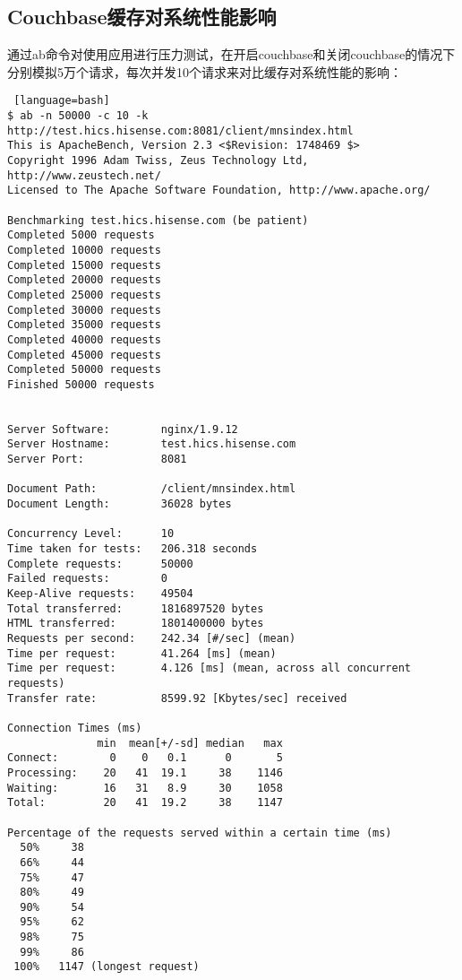 \subsection{Couchbase缓存对系统性能影响}
通过ab命令对使用应用进行压力测试，在开启couchbase和关闭couchbase的情况下分别模拟5万个请求，每次并发10个请求来对比缓存对系统性能的影响：
\begin{lstlisting} [language=bash]
$ ab -n 50000 -c 10 -k http://test.hics.hisense.com:8081/client/mnsindex.html
This is ApacheBench, Version 2.3 <$Revision: 1748469 $>
Copyright 1996 Adam Twiss, Zeus Technology Ltd, http://www.zeustech.net/
Licensed to The Apache Software Foundation, http://www.apache.org/

Benchmarking test.hics.hisense.com (be patient)
Completed 5000 requests
Completed 10000 requests
Completed 15000 requests
Completed 20000 requests
Completed 25000 requests
Completed 30000 requests
Completed 35000 requests
Completed 40000 requests
Completed 45000 requests
Completed 50000 requests
Finished 50000 requests


Server Software:        nginx/1.9.12
Server Hostname:        test.hics.hisense.com
Server Port:            8081

Document Path:          /client/mnsindex.html
Document Length:        36028 bytes

Concurrency Level:      10
Time taken for tests:   206.318 seconds
Complete requests:      50000
Failed requests:        0
Keep-Alive requests:    49504
Total transferred:      1816897520 bytes
HTML transferred:       1801400000 bytes
Requests per second:    242.34 [#/sec] (mean)
Time per request:       41.264 [ms] (mean)
Time per request:       4.126 [ms] (mean, across all concurrent requests)
Transfer rate:          8599.92 [Kbytes/sec] received

Connection Times (ms)
              min  mean[+/-sd] median   max
Connect:        0    0   0.1      0       5
Processing:    20   41  19.1     38    1146
Waiting:       16   31   8.9     30    1058
Total:         20   41  19.2     38    1147

Percentage of the requests served within a certain time (ms)
  50%     38
  66%     44
  75%     47
  80%     49
  90%     54
  95%     62
  98%     75
  99%     86
 100%   1147 (longest request)
\end{lstlisting}

